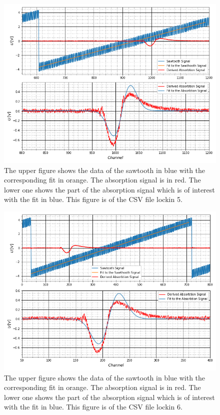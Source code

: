 	\begin{figure}[ht]
		\includegraphics[scale=0.5]{Bild/LockIn5.png}
		\centering
		\caption[Plots and Fits of Lock-In Method 5]{\small The upper figure shows the data of the sawtooth in blue with the corresponding fit in orange. The absorption signal is in red. The lower one shows the part of the absorption signal which is of interest with the fit in blue. This figure is of the CSV file lockin 5.}
		\label{Lock5}
	\end{figure}
	\begin{figure}[ht]
		\includegraphics[scale=0.5]{Bild/LockIn6.png}
		\centering
		\caption[Plots and Fits of Lock-In Method 6]{\small The upper figure shows the data of the sawtooth in blue with the corresponding fit in orange. The absorption signal is in red. The lower one shows the part of the absorption signal which is of interest with the fit in blue. This figure is of the CSV file lockin 6.}
		\label{Lock6}
	\end{figure}
